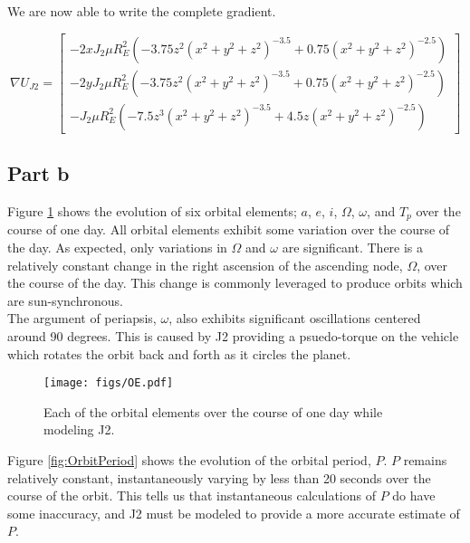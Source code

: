 \documentclass[11pt]{article}
\begin{document}
We are now able to write the complete gradient.

\begin{equation}
	\nabla U_{J2} = \begin{bmatrix}
	- 2 x J_2 \mu R_E^2 \left( -3.75 z^2 \left( x^2 + y^2 + z^2\right)^{-3.5} + 0.75 \left( x^2 + y^2 + z^2\right)^{-2.5} \right) \\
	- 2 y J_2 \mu R_E^2 \left( -3.75 z^2 \left( x^2 + y^2 + z^2\right)^{-3.5} + 0.75 \left( x^2 + y^2 + z^2\right)^{-2.5} \right) \\
	- J_2 \mu R_E^2 \left(  -7.5 z^3 \left( x^2 + y^2 + z^2\right)^{-3.5} + 4.5z\left( x^2 + y^2 + z^2\right)^{-2.5} \right)
	\end{bmatrix}
\end{equation}

\subsection{Part b}

Figure \ref{fig:OE} shows the evolution of six orbital elements; $a$, $e$, $i$, $\Omega$, $\omega$, and $T_p$ over the course of one day. All orbital elements exhibit some variation over the course of the day. As expected, only variations in $\Omega$ and $\omega$ are significant. There is a relatively constant change in the right ascension of the ascending node, $\Omega$, over the course of the day. This change is commonly leveraged to produce orbits which are sun-synchronous. \\

The argument of periapsis, $\omega$, also exhibits significant oscillations centered around 90 degrees. This is caused by J2 providing a psuedo-torque on the vehicle which rotates the orbit back and forth as it circles the planet. \\

\begin{figure}[h!]
	\centering
	\texttt{[image: figs/OE.pdf]}
	\caption{Each of the orbital elements over the course of one day while modeling J2.}
	\label{fig:OE}
\end{figure}

Figure \ref{fig:OrbitPeriod} shows the evolution of the orbital period, $P$. $P$ remains relatively constant, instantaneously varying by less than 20 seconds over the course of the orbit. This tells us that instantaneous calculations of $P$ do have some inaccuracy, and J2 must be modeled to provide a more accurate estimate of $P$. \\
\end{document}
